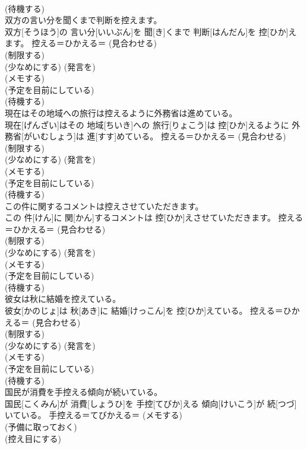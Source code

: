 \documentclass[8pt]{extreport}
\begin{document}
\begin{CJK}{UTF8}{min}
{\\	(待機する) 
\\	双方の言い分を聞くまで判断を控えます。	
\\	双方[そうほう]の 言い分[いいぶん]を 聞[き]くまで 判断[はんだん]を 控[ひか]えます。	控える＝ひかえる＝ (見合わせる) 
\\	(制限する) 
\\	(少なめにする) (発言を) 
\\	(メモする) 
\\	(予定を目前にしている) 
\\	(待機する) 
\\	現在はその地域への旅行は控えるように外務省は進めている。	
\\	現在[げんざい]はその 地域[ちいき]への 旅行[りょこう]は 控[ひか]えるように 外務省[がいむしょう]は 進[すす]めている。	控える＝ひかえる＝ (見合わせる) 
\\	(制限する) 
\\	(少なめにする) (発言を) 
\\	(メモする) 
\\	(予定を目前にしている) 
\\	(待機する) 
\\	この件に関するコメントは控えさせていただきます。	
\\	この 件[けん]に 関[かん]するコメントは 控[ひか]えさせていただきます。	控える＝ひかえる＝ (見合わせる) 
\\	(制限する) 
\\	(少なめにする) (発言を) 
\\	(メモする) 
\\	(予定を目前にしている) 
\\	(待機する) 
\\	彼女は秋に結婚を控えている。	
\\	彼女[かのじょ]は 秋[あき]に 結婚[けっこん]を 控[ひか]えている。	控える＝ひかえる＝ (見合わせる) 
\\	(制限する) 
\\	(少なめにする) (発言を) 
\\	(メモする) 
\\	(予定を目前にしている) 
\\	(待機する) 
\\	国民が消費を手控える傾向が続いている。	
\\	国民[こくみん]が 消費[しょうひ]を 手控[てびか]える 傾向[けいこう]が 続[つづ]いている。	手控える＝てびかえる＝ (メモする) 
\\	(予備に取っておく) 
\\	(控え目にする)
}
\end{CJK}
\end{document}
